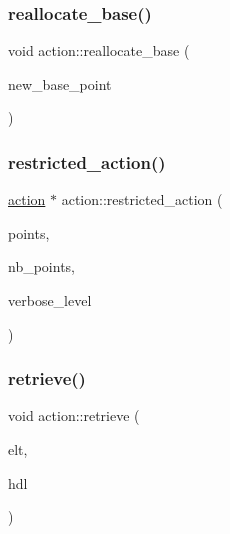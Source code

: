 \mbox{\label{classaction_a59ea889d3aa9e9aee86ffee6b7785bfd}} 
\subsubsection{\texorpdfstring{reallocate\+\_\+base()}{reallocate\_base()}}
{\footnotesize\ttfamily void action\+::reallocate\+\_\+base (\begin{DoxyParamCaption}\item[{\mbox{\hyperlink{galois_8h_a09fddde158a3a20bd2dcadb609de11dc}{I\+NT}}}]{new\+\_\+base\+\_\+point }\end{DoxyParamCaption})}

\mbox{\label{classaction_aa48c1a9e221977b149eb0d8826705b62}} 
\subsubsection{\texorpdfstring{restricted\+\_\+action()}{restricted\_action()}}
{\footnotesize\ttfamily \mbox{\hyperlink{classaction}{action}} $\ast$ action\+::restricted\+\_\+action (\begin{DoxyParamCaption}\item[{\mbox{\hyperlink{galois_8h_a09fddde158a3a20bd2dcadb609de11dc}{I\+NT}} $\ast$}]{points,  }\item[{\mbox{\hyperlink{galois_8h_a09fddde158a3a20bd2dcadb609de11dc}{I\+NT}}}]{nb\+\_\+points,  }\item[{\mbox{\hyperlink{galois_8h_a09fddde158a3a20bd2dcadb609de11dc}{I\+NT}}}]{verbose\+\_\+level }\end{DoxyParamCaption})}

\mbox{\label{classaction_a48f4c0ef671372c1c7c45dafb41bdaf1}} 
\subsubsection{\texorpdfstring{retrieve()}{retrieve()}}
{\footnotesize\ttfamily void action\+::retrieve (\begin{DoxyParamCaption}\item[{void $\ast$}]{elt,  }\item[{\mbox{\hyperlink{galois_8h_a09fddde158a3a20bd2dcadb609de11dc}{I\+NT}}}]{hdl }\end{DoxyParamCaption})}

